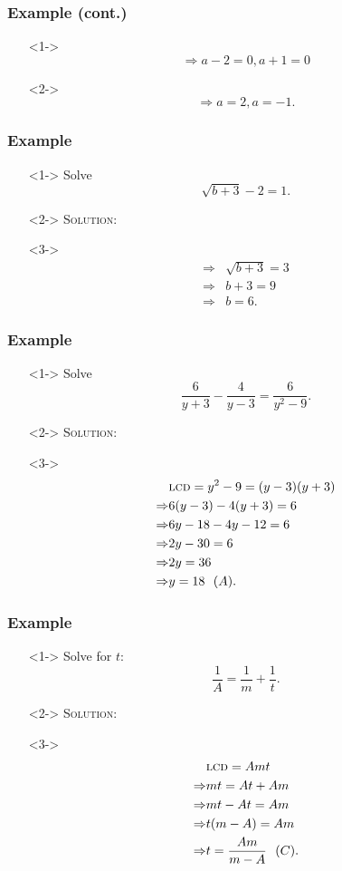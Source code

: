 \documentclass[handout]{beamer}
\begin{document}
\begin{frame}
	\frametitle{Example (cont.)} 
	\begin{enumerate}
		\item[]<1-> \[ \Rightarrow a-2=0, a+1=0 \] 
		\item[]<2-> \[ \Rightarrow a=2, a=-1. \] 
	\end{enumerate}
\end{frame}

\begin{frame}
	\frametitle{Example} 
	\begin{enumerate}
		\item[]<1-> Solve 
		\[
			\sqrt{b+3}-2=1. 
		\]
		\item[]<2-> \textsc{Solution:} 
		\item[]<3-> 
			\begin{align*}
				\Rightarrow & \sqrt{b+3}=3 \\
				\Rightarrow & b+3=9 \\
				\Rightarrow & b=6.  
			\end{align*} 
	\end{enumerate}
\end{frame}

\begin{frame}
	\frametitle{Example} 
	\begin{enumerate}
		\item[]<1-> Solve 
		\[
			\frac{6}{y+3}-\frac{4}{y-3}=\frac{6}{y^{2}-9}. 
		\]
		\item[]<2-> \textsc{Solution:} 
		\item[]<3-> 
			\begin{align*}
			&\text{\textsc{lcd}}=y^{2}-9=(y-3)(y+3) \\
			\Rightarrow & 6(y-3)-4(y+3)=6 \\
			\Rightarrow & 6y-18-4y-12=6 \\
			\Rightarrow & 2y-30=6 \\
			\Rightarrow & 2y=36 \\
			\Rightarrow & y=18~~(A).
			\end{align*} 
	\end{enumerate}
\end{frame}

\begin{frame}
	\frametitle{Example} 
	\begin{enumerate}
		\item[]<1-> Solve for $t$: 
		\[
			\frac{1}{A}=\frac{1}{m}+\frac{1}{t}.  
		\]
		\item[]<2-> \textsc{Solution:} 
		\item[]<3-> 
			\begin{align*}
			&\text{\textsc{lcd}}=Amt \\
			\Rightarrow & mt=At+Am \\
			\Rightarrow & mt-At=Am \\
			\Rightarrow & t(m-A)=Am \\
			\Rightarrow & t=\frac{Am}{m-A}~~(C) .
			\end{align*} 
	\end{enumerate}
\end{frame}
\end{document}

